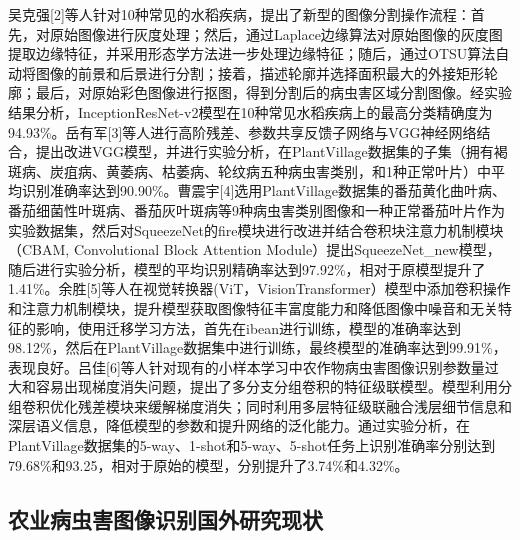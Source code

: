 \documentclass[12pt, a4paper, twoside]{ctexart}
\begin{document}
吴克强[2]等人针对10种常见的水稻疾病，提出了新型的图像分割操作流程：首先，对原始图像进行灰度处理；然后，通过Laplace边缘算法对原始图像的灰度图提取边缘特征，并采用形态学方法进一步处理边缘特征；随后，通过OTSU算法自动将图像的前景和后景进行分割；接着，描述轮廓并选择面积最大的外接矩形轮廓；最后，对原始彩色图像进行抠图，得到分割后的病虫害区域分割图像。经实验结果分析，InceptionResNet-v2模型在10种常见水稻疾病上的最高分类精确度为94.93\%。岳有军[3]等人进行高阶残差、参数共享反馈子网络与VGG神经网络结合，提出改进VGG模型，并进行实验分析，在PlantVillage数据集的子集（拥有褐斑病、炭疽病、黄萎病、枯萎病、轮纹病五种病虫害类别，和1种正常叶片）中平均识别准确率达到90.90\%。曹震宇[4]选用PlantVillage数据集的番茄黄化曲叶病、番茄细菌性叶斑病、番茄灰叶斑病等9种病虫害类别图像和一种正常番茄叶片作为实验数据集，然后对SqueezeNet的fire模块进行改进并结合卷积块注意力机制模块（CBAM, Convolutional Block Attention Module）提出SqueezeNet\_new模型，随后进行实验分析，模型的平均识别精确率达到97.92\%，相对于原模型提升了1.41\%。余胜[5]等人在视觉转换器(ViT，VisionTransformer）模型中添加卷积操作和注意力机制模块，提升模型获取图像特征丰富度能力和降低图像中噪音和无关特征的影响，使用迁移学习方法，首先在ibean进行训练，模型的准确率达到98.12\%，然后在PlantVillage数据集中进行训练，最终模型的准确率达到99.91\%，表现良好。吕佳[6]等人针对现有的小样本学习中农作物病虫害图像识别参数量过大和容易出现梯度消失问题，提出了多分支分组卷积的特征级联模型。模型利用分组卷积优化残差模块来缓解梯度消失；同时利用多层特征级联融合浅层细节信息和深层语义信息，降低模型的参数和提升网络的泛化能力。通过实验分析，在PlantVillage数据集的5-way、1-shot和5-way、5-shot任务上识别准确率分别达到79.68\%和93.25，相对于原始的模型，分别提升了3.74\%和4.32\%。


\subsection{农业病虫害图像识别国外研究现状}
\end{document}
